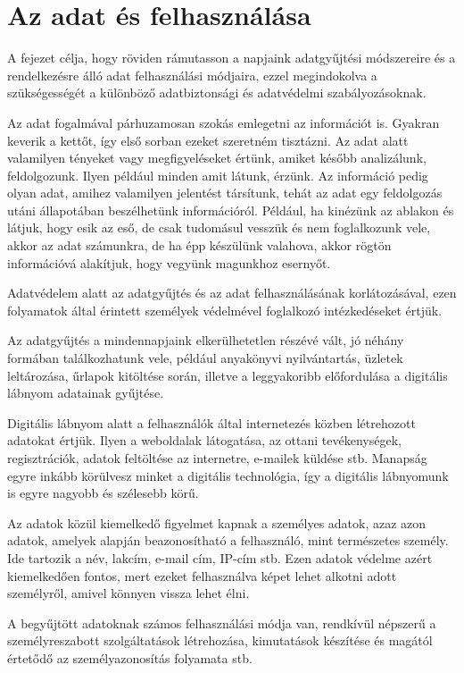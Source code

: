 \chapter{Az adat és felhasználása} \label{az-adat-es-felhasznalasa}

A fejezet célja, hogy röviden rámutasson a napjaink adatgyűjtési módszereire és a rendelkezésre álló adat felhasználási módjaira, ezzel megindokolva a szükségességét a különböző adatbiztonsági és adatvédelmi szabályozásoknak.

Az adat fogalmával párhuzamosan szokás emlegetni az információt is. Gyakran keverik a kettőt, így első sorban ezeket szeretném tisztázni. Az adat alatt valamilyen tényeket vagy megfigyeléseket értünk, amiket később analizálunk, feldolgozunk. Ilyen például minden amit látunk, érzünk. Az információ pedig olyan adat, amihez valamilyen jelentést társítunk, tehát az adat egy feldolgozás utáni állapotában beszélhetünk információról. Például, ha kinézünk az ablakon és látjuk, hogy esik az eső, de csak tudomásul vesszük és nem foglalkozunk vele, akkor az adat számunkra, de ha épp készülünk valahova, akkor rögtön információvá alakítjuk, hogy vegyünk magunkhoz esernyőt.

Adatvédelem alatt az adatgyűjtés és az adat felhasználásának korlátozásával, ezen folyamatok által érintett személyek védelmével foglalkozó intézkedéseket értjük.

Az adatgyűjtés a mindennapjaink elkerülhetetlen részévé vált, jó néhány formában találkozhatunk vele, például anyakönyvi nyilvántartás, üzletek leltározása, űrlapok kitöltése során, illetve a leggyakoribb előfordulása a digitális lábnyom adatainak gyűjtése.

Digitális lábnyom alatt a felhasználók által internetezés közben létrehozott adatokat értjük. Ilyen a weboldalak látogatása, az ottani tevékenységek, regisztrációk, adatok feltöltése az internetre, e-mailek küldése stb. Manapság egyre inkább körülvesz minket a digitális technológia, így a digitális lábnyomunk is egyre nagyobb és szélesebb körű.

Az adatok közül kiemelkedő figyelmet kapnak a személyes adatok, azaz azon adatok, amelyek alapján beazonosítható a felhasználó, mint természetes személy. Ide tartozik a név, lakcím, e-mail cím, IP-cím stb. Ezen adatok védelme azért kiemelkedően fontos, mert ezeket felhasználva képet lehet alkotni adott személyről, amivel könnyen vissza lehet élni.

A begyűjtött adatoknak számos felhasználási módja van, rendkívül népszerű a személyreszabott szolgáltatások létrehozása, kimutatások készítése és magától értetődő az személyazonosítás folyamata stb.

